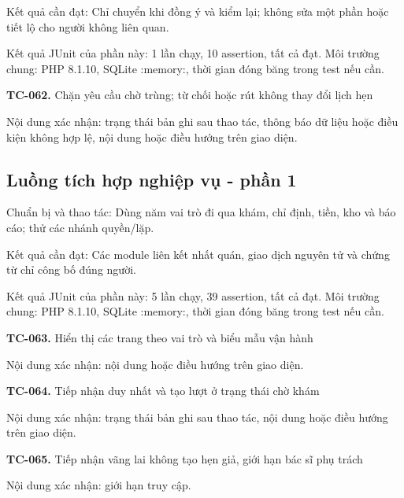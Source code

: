 Kết quả cần đạt:\allowbreak{} Chỉ chuyển khi đồng ý và kiểm lại; không sửa một phần hoặc tiết lộ cho người không liên quan.\allowbreak{}

Kết quả JUnit của phần này:\allowbreak{} 1 lần chạy, 10 assertion, tất cả đạt.\allowbreak{} Môi trường chung:\allowbreak{} PHP 8.\allowbreak{}1.\allowbreak{}10, SQLite :\allowbreak{}memory:\allowbreak{}, thời gian đóng băng trong test nếu cần.\allowbreak{}

\noindent\textbf{TC-062.} Chặn yêu cầu chờ trùng; từ chối hoặc rút không thay đổi lịch hẹn\par
Nội dung xác nhận:\allowbreak{} trạng thái bản ghi sau thao tác, thông báo dữ liệu hoặc điều kiện không hợp lệ, nội dung hoặc điều hướng trên giao diện.\allowbreak{}


\par\vspace{8pt}

\subsection{Luồng tích hợp nghiệp vụ - phần 1}
Chuẩn bị và thao tác:\allowbreak{} Dùng năm vai trò đi qua khám, chỉ định, tiền, kho và báo cáo; thử các nhánh quyền/\allowbreak{}lặp.\allowbreak{}

Kết quả cần đạt:\allowbreak{} Các module liên kết nhất quán, giao dịch nguyên tử và chứng từ chỉ công bố đúng người.\allowbreak{}

Kết quả JUnit của phần này:\allowbreak{} 5 lần chạy, 39 assertion, tất cả đạt.\allowbreak{} Môi trường chung:\allowbreak{} PHP 8.\allowbreak{}1.\allowbreak{}10, SQLite :\allowbreak{}memory:\allowbreak{}, thời gian đóng băng trong test nếu cần.\allowbreak{}

\noindent\textbf{TC-063.} Hiển thị các trang theo vai trò và biểu mẫu vận hành\par
Nội dung xác nhận:\allowbreak{} nội dung hoặc điều hướng trên giao diện.\allowbreak{}

\noindent\textbf{TC-064.} Tiếp nhận duy nhất và tạo lượt ở trạng thái chờ khám\par
Nội dung xác nhận:\allowbreak{} trạng thái bản ghi sau thao tác, nội dung hoặc điều hướng trên giao diện.\allowbreak{}

\noindent\textbf{TC-065.} Tiếp nhận vãng lai không tạo hẹn giả, giới hạn bác sĩ phụ trách\par
Nội dung xác nhận:\allowbreak{} giới hạn truy cập.\allowbreak{}

